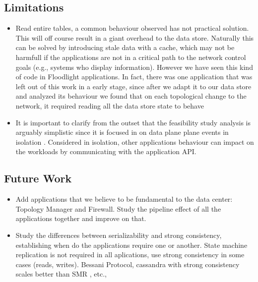 \subsection{Limitations}
\begin{itemize}
\item Read entire tables, a common behaviour observed has not practical solution.  This will off course result in a giant overhead to the data store. Naturally this can be solved by introducing stale data with a cache, which may not be harmfull if the applications are not in a critical path to the network control goals (e.g., systems who display information). However we have seen this kind of code in Floodlight applications. In fact, there was one application that was left out of this work in a early stage, since after we adapt it to our data store and analyzed its behaviour we found that on each topological change to the network, it required reading all the data store state to behave 
\item It is important to clarify from the outset that the feasibility study analysis is arguably simplistic since it is focused in on data plane plane events in isolation . Considered in isolation,
other applications behaviour can impact on the workloads  by communicating with the application API.
\end{itemize}

\subsection{Future Work}
\begin{itemize}
\item Add applications that we believe to be fundamental to the data center: Topology Manager and Firewall.  Study the pipeline effect of all the applications together and improve on that. 
\item Study the differences between serializability and strong consistency, establishing when do the applications require one or another. State machine replication is not required in all aplications, use strong consistency in some cases (reads, writes). Bessani Protocol, cassandra with strong consistency scales better than SMR , etc., 
\end{itemize}


